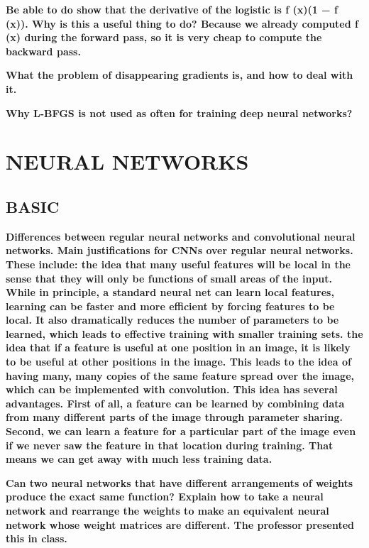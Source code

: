 \documentclass[10pt,letterpaper]{article}
\begin{document}
\subitem \textbf{ Be able to do show that the derivative of the logistic is f (x)(1 − f (x)). Why is this a useful thing to do? Because we already computed f (x) during the forward pass, so it is very cheap to compute the backward pass.}
\begin{solution}
\end{solution}

\subitem \textbf{ What the problem of disappearing gradients is, and how to deal with it.}
\begin{solution}
\end{solution}

\subitem \textbf{ Why L-BFGS is not used as often for training deep neural networks?}
\begin{solution}
\end{solution}

\section{NEURAL NETWORKS}
\subsection{BASIC}
\subitem \textbf{ Differences between regular neural networks and convolutional neural networks. Main justifications for CNNs over regular neural networks.  These include:
\subsubitem the idea that many useful features will be local in the sense that they will only be functions of small areas of the input. While in principle, a standard neural net can learn local features, learning can be faster and more efficient by forcing features to be local. It also dramatically reduces the number of parameters to be learned, which leads to effective training with smaller training sets.
\subsubitem the idea that if a feature is useful at one position in an image, it is likely to be useful at other positions in the image. This leads to the idea of having many, many copies of the same feature spread over the image, which can be implemented with convolution. This idea has several advantages. First of all, a feature can be learned by combining data from many different parts of the image through parameter sharing. Second, we can learn a feature for a particular part of the image even if we never saw the feature in that location during training. That means we can get away with much less training data.}
\begin{solution}
\end{solution}

\subitem \textbf{ Can two neural networks that have different arrangements of weights produce the exact same function? Explain how to take a neural network and rearrange the weights to make an equivalent neural network whose weight matrices are different. The professor presented this in class.}
\begin{solution}
\end{solution}
\end{document}
